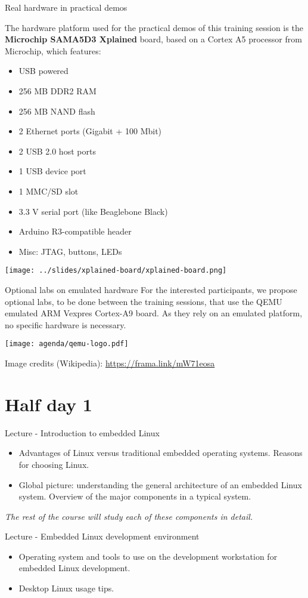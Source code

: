 \documentclass[a4paper,12pt,obeyspaces,spaces,hyphens]{article}
\begin{document}
\feagendatwocolumn
{Real hardware in practical demos}
{
  The hardware platform used for the practical demos of this training
  session is the {\bf Microchip SAMA5D3 Xplained} board, based on a
  Cortex A5 processor from Microchip, which features:

  \begin{itemize}
  \item USB powered
  \item 256 MB DDR2 RAM
  \item 256 MB NAND flash
  \item 2 Ethernet ports (Gigabit + 100 Mbit)
  \item 2 USB 2.0 host ports
  \item 1 USB device port
  \item 1 MMC/SD slot
  \item 3.3 V serial port (like Beaglebone Black)
  \item Arduino R3-compatible header
  \item Misc: JTAG, buttons, LEDs
  \end{itemize}
}
{}
{
  \begin{center}
    \texttt{[image: ../slides/xplained-board/xplained-board.png]}
  \end{center}
}

\feagendatwocolumn
{Optional labs on emulated hardware}
{
  For the interested participants, we propose optional labs, to be
  done between the training sessions, that use the QEMU emulated ARM
  Vexpres Cortex-A9 board. As they rely on an emulated platform, no
  specific hardware is necessary.
}
{}
{
  \begin{center}
    \texttt{[image: agenda/qemu-logo.pdf]}
  \end{center}
  \scriptsize Image credits (Wikipedia): \url{https://frama.link/mW71eosa}
}


\section{Half day 1}

\feagendatwocolumn
{Lecture - Introduction to embedded Linux}
{
  \begin{itemize}
  \item Advantages of Linux versus traditional embedded operating systems.
        Reasons for choosing Linux.
  \item Global picture: understanding the general architecture of an
        embedded Linux system. Overview of the major components in a typical
        system.
  \end{itemize}
  {\em The rest of the course will study each of these components in detail.}
}
{Lecture - Embedded Linux development environment}
{
  \begin{itemize}
  \item Operating system and tools to use on the development
        workstation for embedded Linux development.
  \item Desktop Linux usage tips.
  \end{itemize}
}
\end{document}
